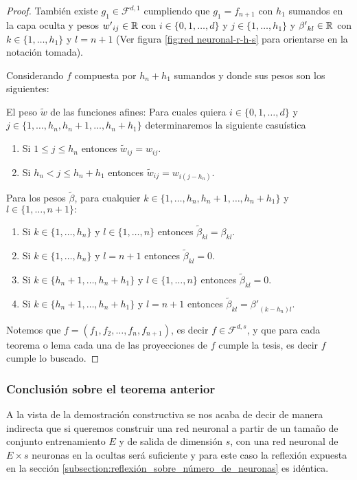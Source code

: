 \begin{proof}
    También existe $g_1 \in \mathcal{F}^{d,1}$ cumpliendo que
    $g_1 = f_{n+1}$ con $h_1$ sumandos en la capa oculta
    y pesos  
    ${w'}_{i j} \in \mathbb{R}$ con 
     $i \in \{0, 1, \ldots , d \}$  y  $j \in \{1, \ldots , h_1 \}$ 
     y ${\beta '}_{ k l} \in \mathbb{R}$ con 
     $k \in \{1, \ldots , h_1 \}$  y  $l = {n+1}$
     (Ver figura \ref{fig:red neuronal-r-h-s} para orientarse en la notación tomada).
     
    Considerando $f$ compuesta por $h_n + h_1$ sumandos y donde sus pesos son los siguientes:

    El peso $\tilde{w}$ de las funciones afines: 
    Para cuales quiera 
    $i \in \{0, 1, \ldots  , d \}$  y  
    $j \in \{1, \ldots , h_n, h_{n} + 1, \ldots, h_n + h_1\}$  determinaremos la siguiente casuística
    \begin{enumerate}
        \item Si $1 \leq j \leq h_n$ entonces $\tilde{w}_{i j} = w_{i j}.$
        \item Si $h_n < j \leq h_n + h_1$ entonces $\tilde{w}_{i j} = w_{i (j-h_n)}.$
    \end{enumerate}

    Para los pesos $\tilde{\beta}$, para cualquier
    $k \in \{1, \ldots , h_n, h_{n} + 1, \ldots, h_n + h_1\}$ y  
    $l \in \{1, \ldots ,  n+1 \} :$ 
    \begin{enumerate}
        \item Si $k \in \{1, \ldots ,  h_n \}$ y $l \in \{1, \ldots , n\}$ 
        entonces $\tilde{\beta}_{k l} = \beta_{k l}.$
        \item Si $k \in \{1, \ldots , h_n \}$ y $l=n+1$ 
        entonces $\tilde{\beta}_{k l} = 0.$
        \item Si $k \in \{h_{n} + 1, \ldots, h_n + h_1 \}$ 
        y $l \in \{1, \ldots , n\}$ 
        entonces $\tilde{\beta}_{k l} = 0.$
        \item Si $k \in \{h_{n} + 1, \ldots, h_n + h_1 \}$ 
        y $l=n+1$ 
        entonces 
        $\tilde{\beta}_{k l} = {\beta '}_{(k- h_n) l}.$
    \end{enumerate}

    Notemos que $f=(f_1, f_2, \ldots, f_n, f_{n+1})$, es decir $f \in \mathcal{F}^{d,s}$, y que para cada teorema o lema
    cada una de las proyecciones de $f$ cumple la tesis, es decir $f$ cumple lo buscado. 
\end{proof}

\subsubsection*{ Conclusión sobre el teorema anterior}  
A la vista de la demostración constructiva se nos acaba de decir de manera indirecta que si queremos construir una red neuronal 
a partir de un tamaño de conjunto entrenamiento $E$ y de salida de dimensión $s$, 
con una red neuronal de $E \times s$ neuronas en la ocultas será suficiente y para este caso la reflexión expuesta en la sección \ref{subsection:reflexión_sobre_número_de_neuronas} es idéntica. 




